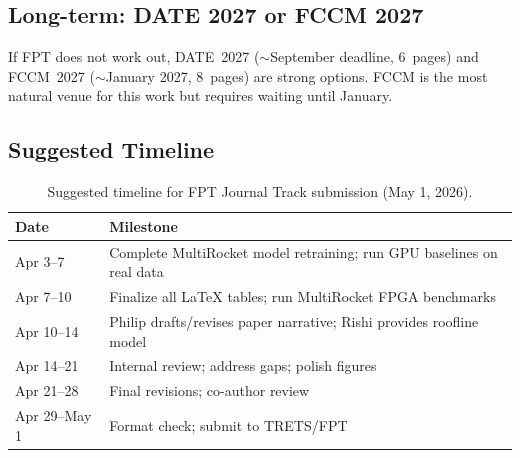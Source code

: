 \documentclass[11pt]{article}
\begin{document}
\subsection{Long-term: DATE 2027 or FCCM 2027}

If FPT does not work out, DATE~2027 ($\sim$September deadline, 6~pages)
and FCCM~2027 ($\sim$January 2027, 8~pages) are strong options.
FCCM is the most natural venue for this work but requires waiting
until January.

\subsection{Suggested Timeline}

\begin{table}[H]
\centering
\caption{Suggested timeline for FPT Journal Track submission (May 1, 2026).}
\label{tab:timeline}
\small
\begin{tabular}{@{}l p{}@{}}
\toprule
\textbf{Date} & \textbf{Milestone} \\
\midrule
Apr 3--7 & Complete MultiRocket model retraining; run GPU baselines on real data \\
Apr 7--10 & Finalize all LaTeX tables; run MultiRocket FPGA benchmarks \\
Apr 10--14 & Philip drafts/revises paper narrative; Rishi provides roofline model \\
Apr 14--21 & Internal review; address gaps; polish figures \\
Apr 21--28 & Final revisions; co-author review \\
Apr 29--May 1 & Format check; submit to TRETS/FPT \\
\bottomrule
\end{tabular}
\end{table}
\end{document}
